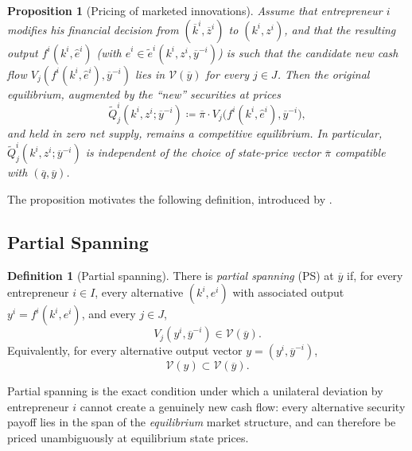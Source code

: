 \documentclass[11pt,a4paper,oneside]{book}
\theoremstyle{plain}
\newtheorem{proposition}[theorem]{Proposition}
\theoremstyle{definition}
\newtheorem{definition}[theorem]{Definition}
\theoremstyle{remark}
\numberwithin{equation}{chapter}
\begin{document}
\begin{proposition}[Pricing of marketed innovations]\label{prop:marketed-pricing}
Assume that entrepreneur $i$ modifies his financial decision from $(\overline{k}^i, \overline{z}^i)$ to $(k^i, z^i)$, and that the resulting output $f^i(k^i, \widehat{e}^i)$ (with $\widehat{e}^i \in \widetilde{e}^i(k^i, z^i, \overline{y}^{-i})$) is such that the candidate new cash flow $V_j(f^i(k^i, \widehat{e}^i), \overline{y}^{-i})$ lies in $\mathcal{V}(\overline{y})$ for every $j \in J$.
Then the original equilibrium, augmented by the ``new'' securities at prices
\begin{equation*}
  \widetilde{Q}^i_j(k^i, z^i; \overline{y}^{-i}) \coloneqq \overline{\pi} \cdot V_j\bigl( f^i(k^i, \widehat{e}^i), \overline{y}^{-i} \bigr),
\end{equation*}
and held in zero net supply, remains a competitive equilibrium.
In particular, $\widetilde{Q}^i_j(k^i, z^i; \overline{y}^{-i})$ is independent of the choice of state-price vector $\overline{\pi}$ compatible with $(\overline{q}, \overline{y})$.
\end{proposition}

The proposition motivates the following definition, introduced by \citet{MagillQuinzii2002}.

\subsection{Partial Spanning}

\begin{definition}[Partial spanning]\label{def:PS}
There is \emph{partial spanning} (PS) at $\overline{y}$ if, for every entrepreneur $i \in I$, every alternative $(k^i, e^i)$ with associated output $y^i = f^i(k^i, e^i)$, and every $j \in J$,
\begin{equation*}
  V_j(y^i, \overline{y}^{-i}) \in \mathcal{V}(\overline{y}).
\end{equation*}
Equivalently, for every alternative output vector $y = (y^i, \overline{y}^{-i})$,
\begin{equation}\label{eq:PS-spanning}
  \mathcal{V}(y) \subset \mathcal{V}(\overline{y}).
\end{equation}
\end{definition}

Partial spanning is the exact condition under which a unilateral deviation by entrepreneur $i$ cannot create a genuinely new cash flow: every alternative security payoff lies in the span of the \emph{equilibrium} market structure, and can therefore be priced unambiguously at equilibrium state prices.
\end{document}
